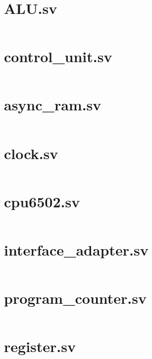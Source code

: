 \documentclass[
	12pt,				  %
	openright,		%
	a4paper,			%
	english,			%
	french,				%
	spanish,			%
	brazil,				%
]{abntex2}
\begin{document}
\begin{apendicesenv}

	\partapendices

	\chapter{ALU.sv}\label{attach:ula}
	\inputminted[breaklines]{systemverilog}{../quartus/synthesis/alu.sv}

	\chapter{control{\_}unit.sv}\label{attach:ula}
	\inputminted[breaklines]{systemverilog}{../quartus/synthesis/control_unit.sv}

	\chapter{async{\_}ram.sv}\label{attach:async_ram}
	\inputminted[breaklines]{systemverilog}{../quartus/synthesis/async_ram.sv}

	\chapter{clock.sv}\label{attach:clock}
	\inputminted[breaklines]{systemverilog}{../quartus/synthesis/clock.sv}

	\chapter{cpu6502.sv}\label{attach:cpu6502}
	\inputminted[breaklines]{systemverilog}{../quartus/synthesis/cpu6502.sv}

	\chapter{interface{\_}adapter.sv}\label{attach:via}
	\inputminted[breaklines]{systemverilog}{../quartus/synthesis/interface_adapter.sv}

	\chapter{program{\_}counter.sv}\label{attach:pc}
	\inputminted[breaklines]{systemverilog}{../quartus/synthesis/program_counter.sv}

	\chapter{register.sv}\label{attach:register}
	\inputminted[breaklines]{systemverilog}{../quartus/synthesis/register.sv}


\end{apendicesenv}
\end{document}
